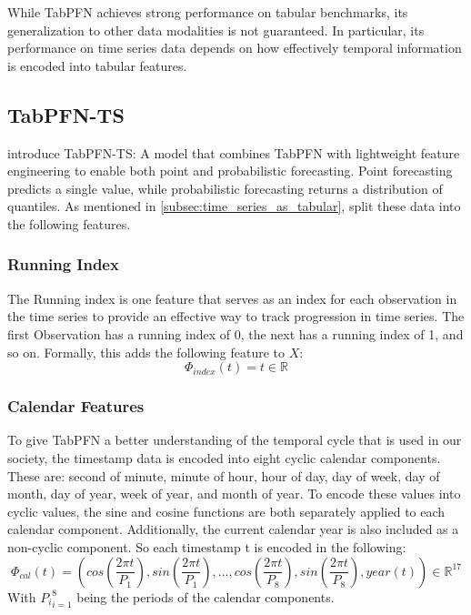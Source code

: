 While TabPFN achieves strong performance on tabular benchmarks, its generalization to other data modalities is not guaranteed.
In particular, its performance on time series data depends on how effectively temporal information is encoded into tabular features.
\subsection{TabPFN-TS}
\label{subsec:tabpfnts}
\citet{hoo2025tables} introduce TabPFN-TS: A model that combines TabPFN with lightweight feature engineering to enable both point and probabilistic forecasting.
Point forecasting predicts a single value, while probabilistic forecasting returns a distribution of quantiles.
As mentioned in \autoref{subsec:time_series_as_tabular}, \citet{hoo2025tables} split these data into the following features.
\subsubsection{Running Index}
The Running index is one feature that serves as an index for each observation in the time series to provide an effective way to track progression in time series.
The first Observation has a running index of 0, the next has a running index of 1, and so on.
Formally, this adds the following feature to $X$:
\[
\Phi_{index}(t) = t \in \mathbb{R}
\]
\subsubsection{Calendar Features}
To give TabPFN a better understanding of the temporal cycle that is used in our society, the timestamp data is encoded into eight cyclic calendar components.
These are: second of minute, minute of hour, hour of day, day of week, day of month, day of year, week of year, and month of year.
To encode these values into cyclic values, the sine and cosine functions are both separately applied to each calendar component.
Additionally, the current calendar year is also included as a non-cyclic component.
So each timestamp t is encoded in the following:
\[
\Phi_{cal}(t)=\left(cos\left(\frac{2 \pi t}{P_1}\right), sin\left(\frac{2 \pi t}{P_1}\right), …, cos\left(\frac{2 \pi t}{P_8}\right), sin\left(\frac{2 \pi t}{P_8}\right), year(t)\right) \in \mathbb{R}^{17}
\]
With ${P_{i}}^8_{i=1}$ being the periods of the calendar components.
